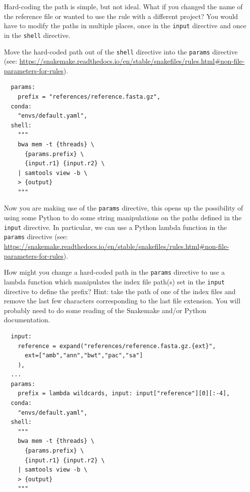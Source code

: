 \begin{questions}

Hard-coding the path is simple, but not ideal.
What if you changed the name of the reference file or wanted to use the rule with a different project?
You would have to modify the paths in multiple places, once in the \texttt{input} directive and once in the \texttt{shell} directive.

Move the hard-coded path out of the \texttt{shell} directive into the \texttt{params} directive (see: \url{https://snakemake.readthedocs.io/en/stable/snakefiles/rules.html#non-file-parameters-for-rules}).

\begin{answer}

\begin{lstlisting}
  params:
    prefix = "references/reference.fasta.gz",
  conda:
    "envs/default.yaml",
  shell:
    """
    bwa mem -t {threads} \
      {params.prefix} \
      {input.r1} {input.r2} \
    | samtools view -b \
    > {output}
    """
\end{lstlisting}

\end{answer}

\end{questions}

\begin{questions}

Now you are making use of the \texttt{params} directive, this opens up the possibility of using some Python to do some string manipulations on the paths defined in the \texttt{input} directive.
In particular, we can use a Python lambda function in the \texttt{params} directive (see: \url{https://snakemake.readthedocs.io/en/stable/snakefiles/rules.html#non-file-parameters-for-rules}).

How might you change a hard-coded path in the \texttt{params} directive to use a lambda function which manipulates the index file path(s) set in the \texttt{input} directive to define the prefix?
Hint: take the path of one of the index files and remove the last few characters corresponding to the last file extension.
You will probably need to do some reading of the Snakemake and/or Python documentation.

\begin{answer}

\begin{lstlisting}
  input:
    reference = expand("references/reference.fasta.gz.{ext}",
      ext=["amb","ann","bwt","pac","sa"]
    ),
  ...
  params:
    prefix = lambda wildcards, input: input["reference"][0][:-4],
  conda:
    "envs/default.yaml",
  shell:
    """
    bwa mem -t {threads} \
      {params.prefix} \
      {input.r1} {input.r2} \
    | samtools view -b \
    > {output}
    """
\end{lstlisting}

\end{answer}

\end{questions}

